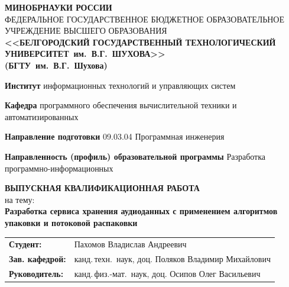 \documentclass[14pt]{extarticle}
\begin{document}
\newpage
\begin{titlepage}
\begin{center}
	\small
	\textbf{МИНОБРНАУКИ РОССИИ} \\[0.5em]
	ФЕДЕРАЛЬНОЕ ГОСУДАРСТВЕННОЕ БЮДЖЕТНОЕ ОБРАЗОВАТЕЛЬНОЕ УЧРЕЖДЕНИЕ 
	ВЫСШЕГО ОБРАЗОВАНИЯ \\[0.3em]
	\textbf{<<БЕЛГОРОДСКИЙ ГОСУДАРСТВЕННЫЙ ТЕХНОЛОГИЧЕСКИЙ\\УНИВЕРСИТЕТ~им.~В.Г.~ШУХОВА>>}\\
	\textbf{(БГТУ~им.~В.Г.~Шухова)}
\end{center}
\vspace{1em}
\begin{list}{}{\setlength{\leftmargin}{0cm}\setlength{\parsep}{1pt}}
	\small\sloppy
	\item\textbf{Институт} информационных технологий и управляющих систем
	\item\textbf{Кафедра} программного обеспечения вычислительной техники и автоматизированных 
	\item\textbf{Направление подготовки} 09.03.04 Программная инженерия
	\item\textbf{Направленность (профиль) образовательной программы} Разработка программно-информационных 
\end{list}
\vspace{0.5cm}	
\begin{center}
\textbf{ВЫПУСКНАЯ КВАЛИФИКАЦИОННАЯ РАБОТА} \\[0em]
на тему: \\[1em]
\textbf{Разработка сервиса хранения аудиоданных с применением алгоритмов упаковки и потоковой распаковки} 
\end{center}
\vfill
\begin{flushleft}
	\small
	\begin{tabular}{@{}l l@{}}
		\hspace{0cm}\textbf{Студент:}         & Пахомов Владислав Андреевич \\
		\hspace{0cm}\textbf{Зав. кафедрой:}   & канд.\,техн.\ наук, доц. Поляков Владимир Михайлович \\
		\hspace{0cm}\textbf{Руководитель:}    & канд.\,физ.-мат.\ наук, доц. Осипов Олег Васильевич

\end{tabular}
\end{flushleft}
\end{titlepage}
\end{document}
